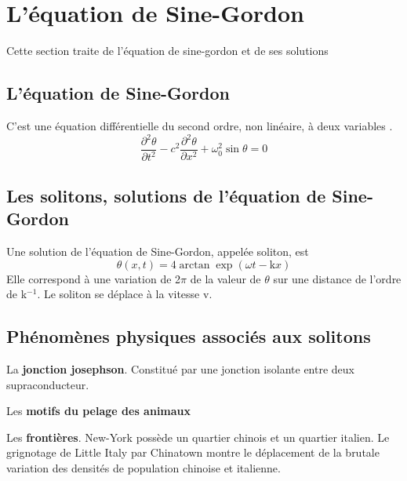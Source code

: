 %
\section{L'équation de Sine-Gordon}
%
Cette section traite de l'équation de sine-gordon et de ses solutions
\subsection{L'équation de Sine-Gordon}
C'est une équation différentielle du second ordre, non linéaire, à deux variables \cite{sine-gordon}.
\[
\frac{\partial^2\theta}{\partial t^2} - c^2 \frac{\partial^2\theta}{\partial x^2} + \omega _0 ^2 \sin \theta = 0
\]
%
%
%
\subsection{Les solitons, solutions de l'équation de Sine-Gordon}
Une solution de l'équation de Sine-Gordon, appelée soliton, est 
\[
\theta(x,t)=4\arctan \exp ( \omega t - \text{k} x )
\]
Elle correspond à une variation de 2$\pi$ de la valeur de $\theta$ sur une distance de l'ordre de k$^{-1}$. Le soliton se déplace à la vitesse v.
\subsection{Phénomènes physiques associés aux solitons}
La {\bf jonction josephson}. Constitué par une jonction isolante entre deux supraconducteur.

Les {\bf motifs du pelage des animaux} \cite{pelage-animaux}

Les {\bf frontières}. New-York possède un quartier chinois et un quartier italien. Le grignotage de Little Italy par Chinatown montre le déplacement de la brutale variation des densités de population chinoise et italienne.

